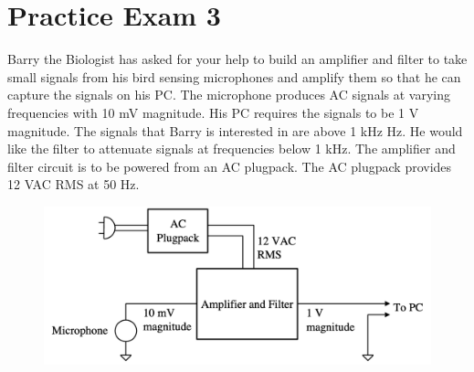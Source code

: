 \chapter{Practice Exam 3}
    Barry the Biologist has asked for your help to build an amplifier and filter to take small signals
    from his bird sensing microphones and amplify them so that he can capture the signals on his
    PC. The microphone produces AC signals at varying frequencies with 10 mV magnitude. His PC
    requires the signals to be 1 V magnitude. The signals that Barry is interested in are above 1 kHz
    Hz. He would like the filter to attenuate signals at frequencies below 1 kHz. The amplifier and
    filter circuit is to be powered from an AC plugpack. The AC plugpack provides 12 VAC RMS at
    50 Hz.
    \begin{figure}[H]
        \centering
        \includegraphics[width=0.6\linewidth]{figures/exams/ac_plugpack.png}
    \end{figure}
